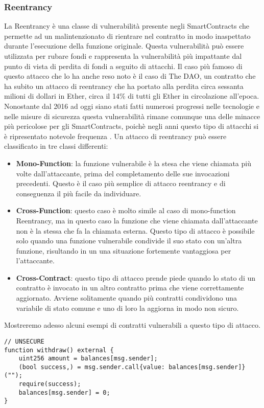 \documentclass[../../Thesis.tex]{subfiles}
\begin{document}
\subsubsection{Reentrancy}
La Reentrancy è una classe di vulnerabilità presente negli SmartContracts che permette ad un malintenzionato di rientrare nel contratto in modo inaspettato durante l'esecuzione della funzione originale. Questa vulnerabilità può essere utilizzata per rubare fondi e rappresenta la vulnerabilità più impattante dal punto di vista di perdita di fondi a seguito di attacchi.
Il caso più famoso di questo attacco che lo ha anche reso noto è il caso di The DAO, un contratto che ha subito un attacco di reentrancy che ha portato alla perdita circa sessanta milioni di dollari in Ether, circa il 14\% di tutti gli Ether in circolazione all'epoca. Nonostante dal 2016 ad oggi siano stati fatti numerosi progressi nelle tecnologie e nelle misure di sicurezza questa vulnerabilità rimane comunque una delle minacce più pericolose per gli SmartContracts, poichè negli anni questo tipo di attacchi si è ripresentato notevole frequenza \cite{reentrancy-historical}. Un attacco di reentrancy può essere classificato in tre classi differenti:
\begin{itemize}
    \item \textbf{Mono-Function}: la funzione vulnerabile è la stesa che viene chiamata più volte dall'attaccante, prima del completamento delle sue invocazioni precedenti. Questo è il caso più semplice di attacco reentrancy e di conseguenza il più facile da individuare.
    \item \textbf{Cross-Function}: questo caso è molto simile al caso di mono-function Reentrancy, ma in questo caso la funzione che viene chiamata dall'attaccante non è la stessa che fa la chiamata esterna. Questo tipo di attacco è possibile solo quando una funzione vulnerabile condivide il suo stato con un'altra funzione, risultando in un una situazione fortemente vantaggiosa per l'attaccante. 
    \item \textbf{Cross-Contract}: questo tipo di attacco prende piede quando lo stato di un contratto è invocato in un altro contratto prima che viene correttamente aggiornato. Avviene solitamente quando più contratti condividono una variabile di stato comune e uno di loro la aggiorna in modo non sicuro. 
\end{itemize}
Mostreremo adesso alcuni esempi di contratti vulnerabili a questo tipo di attacco. 
\begin{lstlisting}[language=Solidity]
// UNSECURE
function withdraw() external {
    uint256 amount = balances[msg.sender];
    (bool success,) = msg.sender.call{value: balances[msg.sender]}("");
    require(success);
    balances[msg.sender] = 0;
}
\end{lstlisting}
\end{document}
